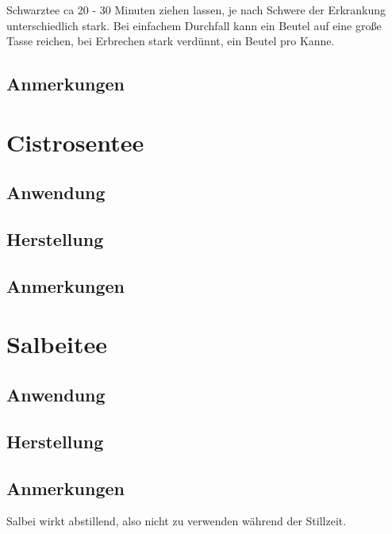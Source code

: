 Schwarztee ca 20 - 30 Minuten ziehen lassen, je nach Schwere der Erkrankung unterschiedlich stark. Bei einfachem Durchfall kann ein Beutel auf eine große Tasse reichen, bei Erbrechen stark verdünnt, ein Beutel pro Kanne.

\subsection{Anmerkungen}


\newpage


\section{Cistrosentee}



\subsection{Anwendung}
\subsection{Herstellung}
\subsection{Anmerkungen}



\newpage


\section{Salbeitee}


  

\subsection{Anwendung}
\subsection{Herstellung}
\subsection{Anmerkungen}

Salbei wirkt abstillend, also nicht zu verwenden während der Stillzeit.



